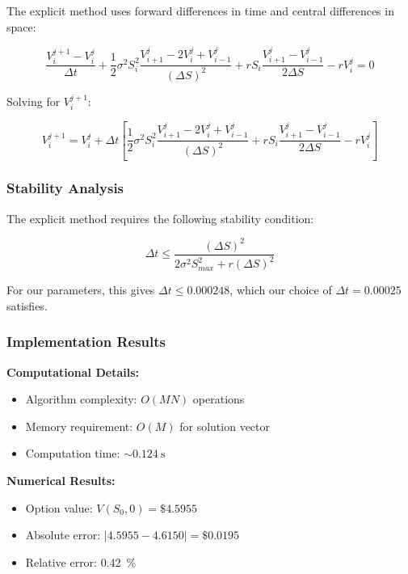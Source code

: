 \documentclass[12pt,a4paper]{article}
\numberwithin{algorithm}{subsection}
\begin{document}
The explicit method uses forward differences in time and central differences in space:

\begin{equation}
\frac{V_i^{j+1} - V_i^j}{\Delta t} + \frac{1}{2}\sigma^2 S_i^2 \frac{V_{i+1}^j - 2V_i^j + V_{i-1}^j}{(\Delta S)^2} + rS_i \frac{V_{i+1}^j - V_{i-1}^j}{2\Delta S} - rV_i^j = 0
\end{equation}

Solving for $V_i^{j+1}$:

\begin{equation}
V_i^{j+1} = V_i^j + \Delta t \left[ \frac{1}{2}\sigma^2 S_i^2 \frac{V_{i+1}^j - 2V_i^j + V_{i-1}^j}{(\Delta S)^2} + rS_i \frac{V_{i+1}^j - V_{i-1}^j}{2\Delta S} - rV_i^j \right]
\end{equation}

\subsubsection{Stability Analysis}

The explicit method requires the following stability condition:

\begin{equation}
\Delta t \leq \frac{(\Delta S)^2}{2\sigma^2 S_{max}^2 + r(\Delta S)^2}
\end{equation}

For our parameters, this gives $\Delta t \leq 0.000248$, which our choice of $\Delta t = 0.00025$ satisfies.

\subsubsection{Implementation Results}

\textbf{Computational Details:}
\begin{itemize}
\item Algorithm complexity: $O(MN)$ operations
\item Memory requirement: $O(M)$ for solution vector
\item Computation time: $\sim\SI{0.124}{\second}$
\end{itemize}

\textbf{Numerical Results:}
\begin{itemize}
\item Option value: $V(S_0, 0) = \$4.5955$
\item Absolute error: $|4.5955 - 4.6150| = \$0.0195$
\item Relative error: \SI{0.42}{\percent}
\end{itemize}
\end{document}

